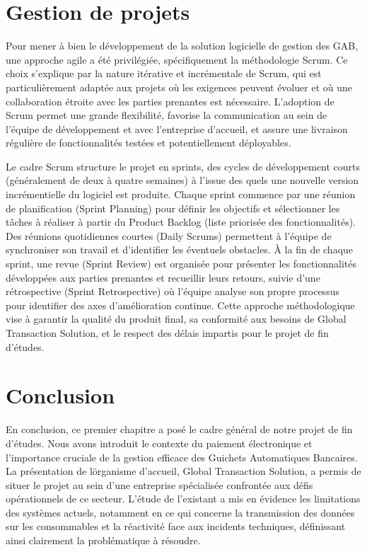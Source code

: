 \documentclass[a4paper,15pt]{report}
\begin{document}
	\section{Gestion de projets}
	\label{sec:gestion}
	
	Pour mener à bien le développement de la solution logicielle de gestion des GAB, une approche agile a été privilégiée, spécifiquement la méthodologie Scrum. Ce choix s'explique par la nature itérative et incrémentale de Scrum, qui est particulièrement adaptée aux projets où les exigences peuvent évoluer et où une collaboration étroite avec les parties prenantes est nécessaire. L'adoption de Scrum permet une grande flexibilité, favorise la communication au sein de l'équipe de développement et avec l'entreprise d'accueil, et assure une livraison régulière de fonctionnalités testées et potentiellement déployables.
	
	Le cadre Scrum structure le projet en sprints, des cycles de développement courts (généralement de deux à quatre semaines) à l'issue des quels une nouvelle version incrémentielle du logiciel est produite. Chaque sprint commence par une réunion de planification (Sprint Planning) pour définir les objectifs et sélectionner les tâches à réaliser à partir du Product Backlog (liste priorisée des fonctionnalités). Des réunions quotidiennes courtes (Daily Scrums) permettent à l'équipe de synchroniser son travail et d'identifier les éventuels obstacles. À la fin de chaque sprint, une revue (Sprint Review) est organisée pour présenter les fonctionnalités développées aux parties prenantes et recueillir leurs retours, suivie d'une rétrospective (Sprint Retrospective) où l'équipe analyse son propre processus pour identifier des axes d'amélioration continue. Cette approche méthodologique vise à garantir la qualité du produit final, sa conformité aux besoins de Global Transaction Solution, et le respect des délais impartis pour le projet de fin d'études.
	
	\section{Conclusion}
	\label{sec:conclusion}
	
	En conclusion, ce premier chapitre a posé le cadre général de notre projet de fin d'études. Nous avons introduit le contexte du paiement électronique et l'importance cruciale de la gestion efficace des Guichets Automatiques Bancaires. La présentation de l\"organisme d'accueil, Global Transaction Solution, a permis de situer le projet au sein d'une entreprise spécialisée confrontée aux défis opérationnels de ce secteur. L'étude de l'existant a mis en évidence les limitations des systèmes actuels, notamment en ce qui concerne la transmission des données sur les consommables et la réactivité face aux incidents techniques, définissant ainsi clairement la problématique à résoudre.
	
\end{document}
